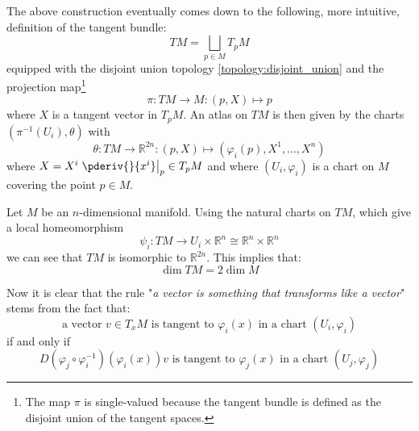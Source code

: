 	\begin{adefinition}
		The above construction eventually comes down to the following, more intuitive, definition of the tangent bundle:
		\begin{equation}
			TM = \bigsqcup_{p\in M}T_pM
		\end{equation}
		equipped with the disjoint union topology \ref{topology:disjoint_union} and the projection map\footnote{The map $\pi$ is single-valued because the tangent bundle is defined as the disjoint union of the tangent spaces.}
		\begin{equation}
			\pi:TM\rightarrow M:(p, X)\mapsto p
		\end{equation}
		where $X$ is a tangent vector in $T_pM$. An atlas on $TM$ is then given by the charts $(\pi^{-1}(U_i), \theta)$ with
		\begin{equation}
			\theta:TM\rightarrow\mathbb{R}^{2n}:(p, X)\mapsto(\varphi_i(p), X^1, ..., X^n)
		\end{equation}
		where $X = X^i\left.\pderiv{}{x^i}\right|_p\in T_pM$ and where $(U_i, \varphi_i)$ is a chart on $M$ covering the point $p\in M$.
	\end{adefinition}
	
	\begin{property}
		Let $M$ be an $n$-dimensional manifold. Using the natural charts on $TM$, which give a local homeomorphism \[\psi_i:TM\rightarrow U_i\times\mathbb{R}^n\cong\mathbb{R}^n\times\mathbb{R}^n\] we can see that $TM$ is isomorphic to $\mathbb{R}^{2n}$. This implies that:
		\begin{equation}
			\boxed{\dim TM = 2\dim M}
		\end{equation}
	\end{property}
	
	\begin{remark}
		Now it is clear that the rule "\textit{a vector is something that transforms like a vector}" stems from the fact that:
		\[\text{a vector }v\in T_xM\text{ is tangent to }\varphi_i(x)\text{ in a chart }(U_i, \varphi_i)\]
		if and only if
		\[D(\varphi_j\circ\varphi_i^{-1})(\varphi_i(x))v\text{ is tangent to }\varphi_j(x)\text{ in a chart }(U_j, \varphi_j)\]
	\end{remark}
	
